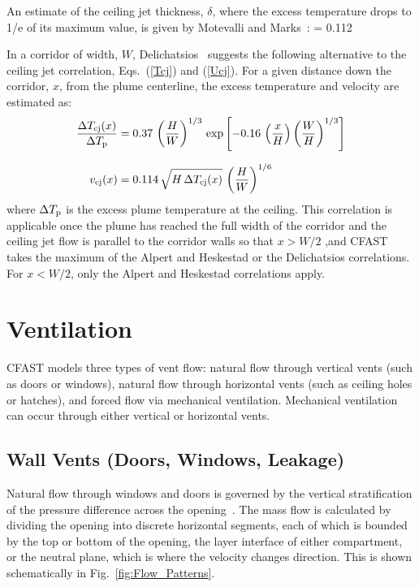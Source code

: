 \documentclass[12pt,twoside]{book}
\begin{document}
An estimate of the ceiling jet thickness, $\delta$, where the excess temperature drops to 1/e of its maximum value, is given by Motevalli and Marks~\cite{Alpert:SFPE}:
\be
    = 0.112 \, 
\ee

In a corridor of width, $W$, Delichatsios~\cite{Alpert:SFPE} suggests the following alternative to the ceiling jet correlation, Eqs.~(\ref{Tcj}) and (\ref{Ucj}). For a given distance down the corridor, $x$, from the plume centerline, the excess temperature and velocity are estimated as:
\begin{align}
   \frac{\Delta T_{\mathrm{cj}}(x)}{\Delta T\sb{\mathrm{p}}} &= 0.37 \, \left( \frac{H}{W} \right)^{1/3} \, \exp \left[ -0.16 \, \left( \frac{x}{H} \right) \left( \frac{W}{H} \right)^{1/3} \right]  \\[0.1in]
   v_{\mathrm{cj}}(x) &= 0.114 \, \sqrt{H \, \Delta T_{\mathrm{cj}}(x) } \, \left( \frac{H}{W} \right)^{1/6}
\end{align}
where $\Delta T\sb{\mathrm{p}}$ is the excess plume temperature at the ceiling. This correlation is applicable once the plume has reached the full width of the corridor and the ceiling jet flow is parallel to the corridor walls so that $x>W/2$ ,and CFAST takes the maximum of the Alpert and Heskestad or the Delichatsios correlations. For $x<W/2$, only the Alpert and Heskestad correlations apply.


%
%

\chapter{Ventilation}

CFAST models three types of vent flow: natural flow through vertical vents (such as doors or windows),  natural flow through horizontal vents (such as ceiling holes or hatches), and forced flow via mechanical ventilation. Mechanical ventilation can occur through either vertical or horizontal vents.


\section{Wall Vents (Doors, Windows, Leakage)}

Natural flow through windows and doors is governed by the vertical stratification of the pressure difference across the opening~\cite{Emmons:SFPE}. The mass flow is calculated by dividing the opening into discrete horizontal segments, each of which is bounded by the top or bottom of the opening, the layer interface of either compartment, or the neutral plane, which is where the velocity changes direction. This is shown schematically in Fig.~\ref{fig:Flow_Patterns}.
\end{document}
